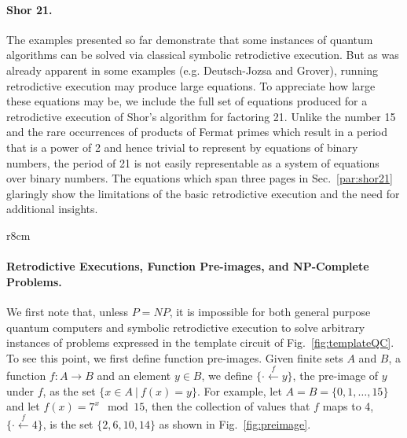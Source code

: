\documentclass{article}
\newcommand{\preim}[2]{\{\cdot\stackrel{#1}{\longleftarrow}{#2}\}}
\begin{document}
\begin{refsection}
\paragraph*{Shor 21.} 
The examples presented so far demonstrate that some instances of
quantum algorithms can be solved via classical symbolic retrodictive
execution. But as was already apparent in some examples
(e.g. Deutsch-Jozsa and Grover), running retrodictive execution may
produce large equations. To appreciate how large these equations may
be, we include the full set of equations produced for a retrodictive
execution of Shor's algorithm for factoring 21. Unlike the number 15
and the rare occurrences of products of Fermat primes which result in
a period that is a power of 2 and hence trivial to represent by
equations of binary numbers, the period of 21 is not easily
representable as a system of equations over binary numbers. The
equations which span three pages in Sec.~\ref{par:shor21} glaringly
show the limitations of the basic retrodictive execution and the need
for additional insights.

\begin{wrapfigure}{r}{8cm}
\begin{center}
\end{center}
\caption{\label{fig:preimage}The pre-image of 4 under $f(x) = 7^x \mod 15$.}
\end{wrapfigure}
\paragraph*{Retrodictive Executions, Function Pre-images, and NP-Complete Problems.}
We first note that, unless $\mathit{P}=\mathit{NP}$, it is impossible
for both general purpose quantum computers and symbolic retrodictive
execution to solve arbitrary instances of problems expressed in the
template circuit of Fig.~\ref{fig:templateQC}. To see this point, we
first define function pre-images. Given finite sets $A$ and $B$, a
function $f : A \rightarrow B$ and an element $y \in B$, we define
$\preim{f}{y}$, the pre-image of $y$ under $f$, as the set $\{ x \in A
~|~ f(x) = y \}$. For example, let $A = B = \{0,1,\ldots,15\}$ and let
$f(x) = 7^x \mod 15$, then the collection of values that $f$ maps to
4, $\preim{f}{4}$, is the set $\{ 2, 6, 10, 14 \}$ as shown in
Fig.~\ref{fig:preimage}.


\end{refsection}
\end{document}
